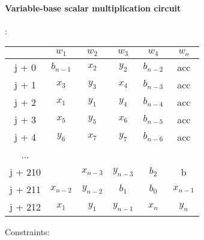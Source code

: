 \paragraph{Variable-base scalar multiplication circuit}:
\begin{center}
\begin{tabular}{ |c|c|c|c|c|c } 
  & $w_1$ & $w_2$ & $w_3$ & $w_4$ & $w_o$\\ 
 \hline
j + 0 & $b_{n - 1}$ & $x_2$ & $y_2$ & $b_{n - 2}$ & acc\\ 
j + 1 & $x_3$ & $ y_3$ & $x_4$ & $b_{n - 3}$ & acc\\ 
j + 2 & $x_1$ & $ y_1$ & $y_4$ & $b_{n - 4}$ & acc\\ 
j + 3 & $x_5$ & $y_5$ & $x_6$ & $b_{n - 5}$ & acc \\ 
j + 4 & $y_6$ & $ x_7$ & $y_7$ & $b_{n - 6}$ & acc\\
... & & & & &\\ 
j + 210 &  & $x_{n-3}$ & $y_{n-3}$ & $b_2$ & b\\ 
j + 211 & $x_{n-2}$ & $ y_{n-2}$ & $b_1$ & $b_0$ & $x_{n-1}$\\ 
j + 212 & $x_1$ & $ y_1$ & $y_{n-1}$ & $x_n$ & $y_n$ \\ 

 \hline
\end{tabular}
\end{center}
 Constraints:
